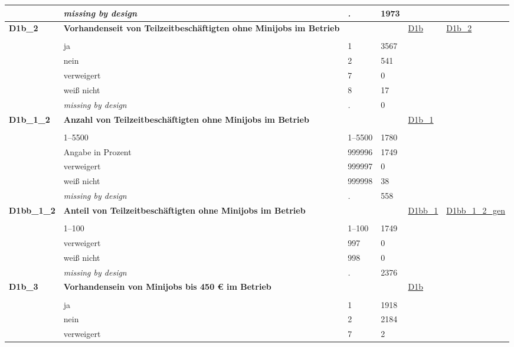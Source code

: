 \begin{longtable}{| L{2.45cm} | L{6cm} | C{1.5cm} | R{1cm} | C{2.25cm} | C{2.25cm} |}
   & \textit{missing by design} & \textit{.} & 1973 &  &  \\ 
   \midrule
\textbf{D1b\_2}\label{var:D1b:2} & \textbf{Vorhandenseit von Teilzeitbeschäftigten ohne Minijobs im Betrieb} &  &  & \hyperref[D1b]{D1b} & \hyperref[var:suf:D1b:2]{D1b\_2} \\ 
   &  &  &  &  &  \\ 
   & ja & 1 & 3567 &  &  \\ 
   & nein & 2 & 541 &  &  \\ 
   & verweigert & 7 & 0 &  &  \\ 
   & weiß nicht & 8 & 17 &  &  \\ 
   & \textit{missing by design} & \textit{.} & 0 &  &  \\ 
   \midrule
\textbf{D1b\_1\_2}\label{var:D1b:1:2} & \textbf{Anzahl von Teilzeitbeschäftigten ohne Minijobs im Betrieb} &  &  & \hyperref[D1b:1]{D1b\_1} & \hyperref[var:suf:]{} \\ 
   &  &  &  &  &  \\ 
   & 1--5500 & 1--5500 & 1780 &  &  \\ 
   & Angabe in Prozent & 999996 & 1749 &  &  \\ 
   & verweigert & 999997 & 0 &  &  \\ 
   & weiß nicht & 999998 & 38 &  &  \\ 
   & \textit{missing by design} & \textit{.} & 558 &  &  \\ 
   \midrule
\textbf{D1bb\_1\_2}\label{var:D1bb:1:2} & \textbf{Anteil von Teilzeitbeschäftigten ohne Minijobs im Betrieb} &  &  & \hyperref[D1bb:1]{D1bb\_1} & \hyperref[var:suf:D1bb:1:2:gen]{D1bb\_1\_2\_gen} \\ 
   &  &  &  &  &  \\ 
   & 1--100 & 1--100 & 1749 &  &  \\ 
   & verweigert & 997 & 0 &  &  \\ 
   & weiß nicht & 998 & 0 &  &  \\ 
   & \textit{missing by design} & \textit{.} & 2376 &  &  \\ 
   \midrule
\textbf{D1b\_3}\label{var:D1b:3} & \textbf{Vorhandensein von Minijobs bis 450 € im Betrieb} &  &  & \hyperref[D1b]{D1b} & \hyperref[var:suf:]{} \\ 
   &  &  &  &  &  \\ 
   & ja & 1 & 1918 &  &  \\ 
   & nein & 2 & 2184 &  &  \\ 
   & verweigert & 7 & 2 &  &  \\ 

\end{longtable}
